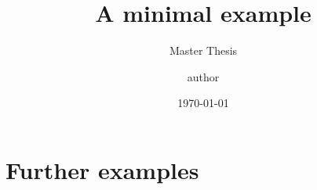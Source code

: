 \documentclass{beamer}
\title{A minimal example}
\date{\today}
\author{author}
\subtitle{Master Thesis}
\begin{document}
\maketitle
\maketoc





\section[Example3]{Further examples}








\end{document}
